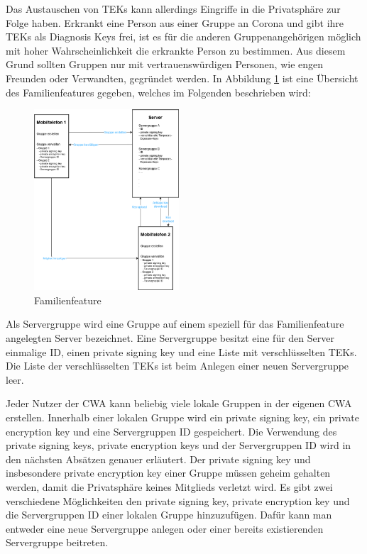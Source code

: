 \documentclass[conference]{IEEEtran}
\begin{document}
Das Austauschen von TEKs kann allerdings Eingriffe in die Privatsphäre zur Folge haben.
Erkrankt eine Person aus einer Gruppe an Corona und gibt ihre TEKs als Diagnosis Keys frei, ist es für die anderen Gruppenangehörigen möglich mit hoher Wahrscheinlichkeit die erkrankte Person zu bestimmen.
Aus diesem Grund sollten Gruppen nur mit vertrauenswürdigen Personen, wie engen Freunden oder Verwandten, gegründet werden.
In Abbildung \ref{Familienfeature_Abbildung} ist eine Übersicht des Familienfeatures gegeben, welches im Folgenden beschrieben wird:

\begin{figure}[h]
	\centering
	\includegraphics[width=0.48\textwidth]{"Familiengruppe"}
	\caption{Familienfeature}
	\label{Familienfeature_Abbildung}
\end{figure}

Als Servergruppe wird eine Gruppe auf einem speziell für das Familienfeature angelegten Server bezeichnet.
Eine Servergruppe besitzt eine für den Server einmalige ID, einen private signing key und eine Liste mit verschlüsselten TEKs.
Die Liste der verschlüsselten TEKs ist beim Anlegen einer neuen Servergruppe leer.

Jeder Nutzer der CWA kann beliebig viele lokale Gruppen in der eigenen CWA erstellen.
Innerhalb einer lokalen Gruppe wird ein private signing key, ein private encryption key und eine Servergruppen ID gespeichert.
Die Verwendung des private signing keys, private encryption keys und der Servergruppen ID wird in den nächsten Absätzen genauer erläutert.
Der private signing key und insbesondere private encryption key einer Gruppe müssen geheim gehalten werden, damit die Privatsphäre keines Mitglieds verletzt wird.
Es gibt zwei verschiedene Möglichkeiten den private signing key, private encryption key und die Servergruppen ID einer lokalen Gruppe hinzuzufügen.
Dafür kann man entweder eine neue Servergruppe anlegen oder einer bereits existierenden Servergruppe beitreten.
\end{document}
